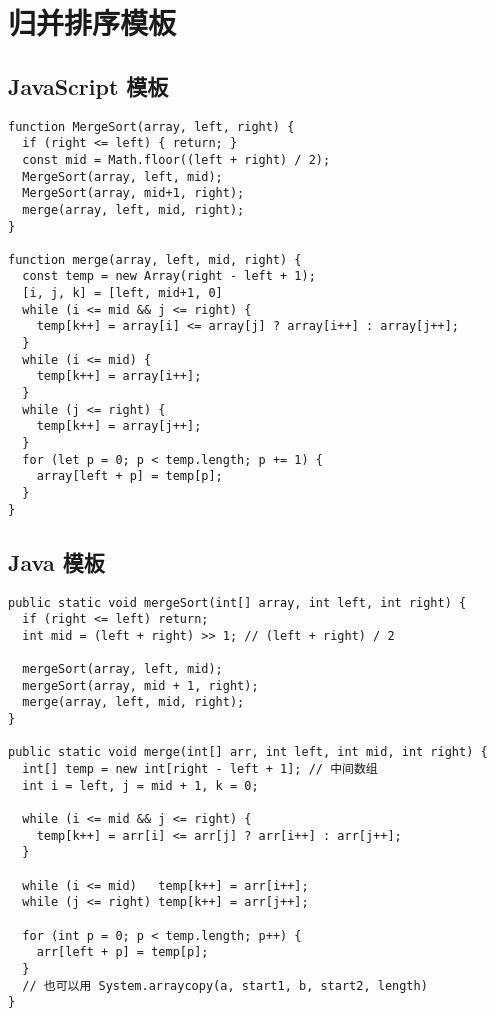 \newpage
\section{归并排序模板}

\subsection{JavaScript 模板}

\begin{verbatim}
function MergeSort(array, left, right) {
  if (right <= left) { return; }
  const mid = Math.floor((left + right) / 2);
  MergeSort(array, left, mid);
  MergeSort(array, mid+1, right);
  merge(array, left, mid, right);
}

function merge(array, left, mid, right) {
  const temp = new Array(right - left + 1);
  [i, j, k] = [left, mid+1, 0]
  while (i <= mid && j <= right) {
    temp[k++] = array[i] <= array[j] ? array[i++] : array[j++];
  }
  while (i <= mid) {
    temp[k++] = array[i++];
  }
  while (j <= right) {
    temp[k++] = array[j++];
  }
  for (let p = 0; p < temp.length; p += 1) {
    array[left + p] = temp[p];
  }
}
\end{verbatim}

\subsection{Java 模板}

\begin{verbatim}
public static void mergeSort(int[] array, int left, int right) {
  if (right <= left) return;
  int mid = (left + right) >> 1; // (left + right) / 2

  mergeSort(array, left, mid);
  mergeSort(array, mid + 1, right);
  merge(array, left, mid, right);
}

public static void merge(int[] arr, int left, int mid, int right) {
  int[] temp = new int[right - left + 1]; // 中间数组
  int i = left, j = mid + 1, k = 0;

  while (i <= mid && j <= right) {
    temp[k++] = arr[i] <= arr[j] ? arr[i++] : arr[j++];
  }

  while (i <= mid)   temp[k++] = arr[i++];
  while (j <= right) temp[k++] = arr[j++];

  for (int p = 0; p < temp.length; p++) {
    arr[left + p] = temp[p];
  }
  // 也可以用 System.arraycopy(a, start1, b, start2, length)
}
\end{verbatim}
